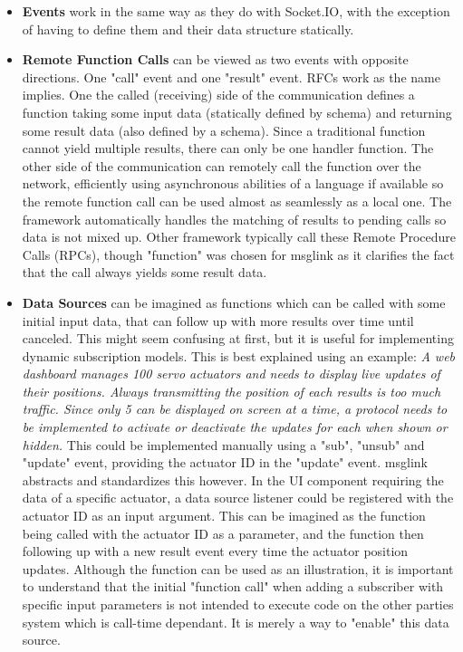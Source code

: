 \documentclass[conference]{IEEEtran}
\begin{document}
\begin{itemize}
    \item \textbf{Events} work in the same way as they do with Socket.IO, with the exception of having to define them and their data structure statically.
    \item \textbf{Remote Function Calls} can be viewed as two events with opposite directions. One "call" event and one "result" event. RFCs work as the name implies. One the called (receiving) side of the communication defines a function taking some input data (statically defined by schema) and returning some result data (also defined by a schema). Since a traditional function cannot yield multiple results, there can only be one handler function. The other side of the communication can remotely call the function over the network, efficiently using asynchronous abilities of a language if available so the remote function call can be used almost as seamlessly as a local one. The framework automatically handles the matching of results to pending calls so data is not mixed up. Other framework typically call these Remote Procedure Calls (RPCs), though "function" was chosen for msglink as it clarifies the fact that the call always yields some result data.
    \item \textbf{Data Sources} can be imagined as functions which can be called with some initial input data, that can follow up with more results over time until canceled. This might seem confusing at first, but it is useful for implementing dynamic subscription models. This is best explained using an example: \textit{A web dashboard manages 100 servo actuators and needs to display live updates of their positions. Always transmitting the position of each results is too much traffic. Since only 5 can be displayed on screen at a time, a protocol needs to be implemented to activate or deactivate the updates for each when shown or hidden.} This could be implemented manually using a "sub", "unsub" and "update" event, providing the actuator ID in the "update" event. msglink abstracts and standardizes this however. In the UI component requiring the data of a specific actuator, a data source listener could be registered with the actuator ID as an input argument. This can be imagined as the function being called with the actuator ID as a parameter, and the function then following up with a new result event every time the actuator position updates. Although the function can be used as an illustration, it is important to understand that the initial "function call" when adding a subscriber with specific input parameters is not intended to execute code on the other parties system which is call-time dependant. It is merely a way to "enable" this data source.
\end{itemize}
\end{document}
